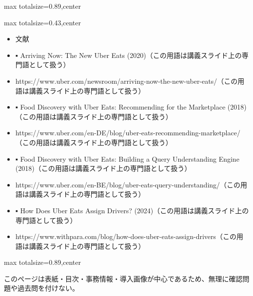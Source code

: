 \begin{minipage}[t]{0.58\textwidth}
\begin{adjustbox}{max totalsize={\textwidth}{0.89\textheight},center}
\begin{minipage}{\textwidth}
\end{minipage}
\end{adjustbox}
\end{minipage}


\clearpage
{}
\begin{minipage}[t]{0.405\textwidth}
\begin{adjustbox}{max totalsize={\textwidth}{0.43\textheight},center}
\begin{minipage}{\textwidth}\scriptsize
{}\begin{itemize}
\item 文献
\item ▪ Arriving Now: The New Uber Eats (2020)（この用語は講義スライド上の専門語として扱う）
\item https://www.uber.com/newsroom/arriving-now-the-new-uber-eats/（この用語は講義スライド上の専門語として扱う）
\item ▪ Food Discovery with Uber Eats: Recommending for the Marketplace (2018)（この用語は講義スライド上の専門語として扱う）
\item https://www.uber.com/en-DE/blog/uber-eats-recommending-marketplace/（この用語は講義スライド上の専門語として扱う）
\item ▪ Food Discovery with Uber Eats: Building a Query Understanding Engine (2018)（この用語は講義スライド上の専門語として扱う）
\item https://www.uber.com/en-BE/blog/uber-eats-query-understanding/（この用語は講義スライド上の専門語として扱う）
\item ▪ How Does Uber Eats Assign Drivers? (2024)（この用語は講義スライド上の専門語として扱う）
\item https://www.withpara.com/blog/how-does-uber-eats-assign-drivers（この用語は講義スライド上の専門語として扱う）
\end{itemize}
\end{minipage}
\end{adjustbox}
\end{minipage}\hfill
\begin{minipage}[t]{0.58\textwidth}
\begin{adjustbox}{max totalsize={\textwidth}{0.89\textheight},center}
\begin{minipage}{\textwidth}\scriptsize
{}このページは表紙・目次・事務情報・導入画像が中心であるため、無理に確認問題や過去問を付けない。
\end{minipage}
\end{adjustbox}
\end{minipage}

